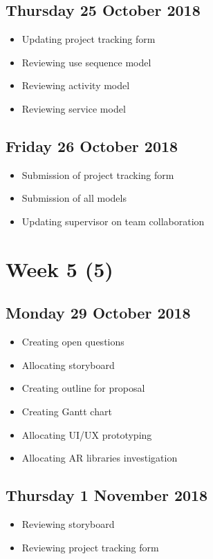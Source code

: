 \subsection*{Thursday 25 October 2018}
\begin{itemize}
	\item Updating project tracking form
	\item Reviewing use sequence model
	\item Reviewing activity model
	\item Reviewing service model 
\end{itemize}

\subsection*{Friday 26 October 2018}
\begin{itemize}
    \item Submission of project tracking form
	\item Submission of all models
	\item Updating supervisor on team collaboration
\end{itemize}

\section*{Week 5 (5)}
\subsection*{Monday 29 October 2018}
\begin{itemize}
    \item Creating open questions
	\item Allocating storyboard
	\item Creating outline for proposal
	\item Creating Gantt chart
	\item Allocating UI/UX prototyping
	\item Allocating AR libraries investigation
\end{itemize}

\subsection*{Thursday 1 November 2018}
\begin{itemize}
	\item Reviewing storyboard
	\item Reviewing project tracking form
\end{itemize}

